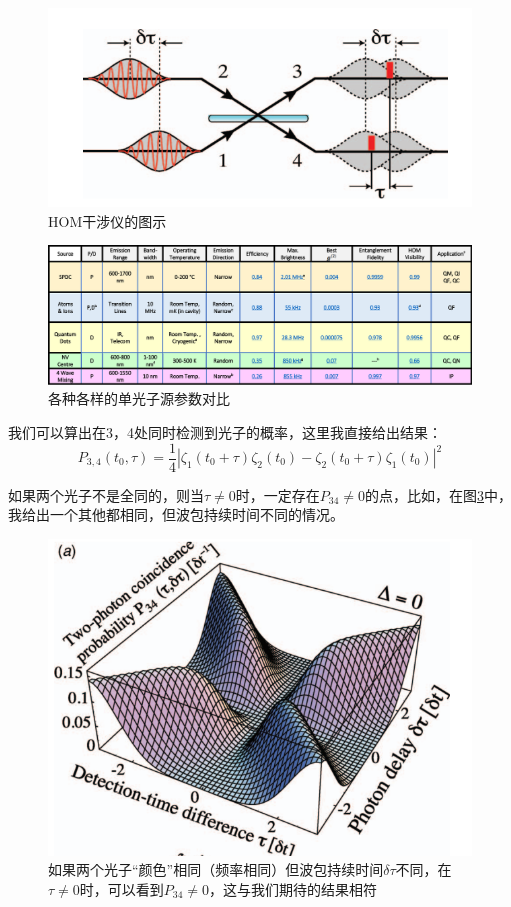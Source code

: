 \begin{figure}[ht]
	\centering
	\includegraphics[scale=0.25]{pic/hom}
	\caption{HOM干涉仪的图示}
	\label{fig:hom}
\end{figure}


\begin{figure}[ht]
	\centering
	\includegraphics[scale=0.25]{pic/singlephotonsources}
	\caption{各种各样的单光子源参数对比}
	\label{fig:singlephotonsources}
\end{figure}


我们可以算出在3，4处同时检测到光子的概率，这里我直接给出结果：
\[P_{3,4}(t_0,\tau)=\frac{1}{4}|\zeta_1(t_0+\tau)\zeta_2(t_0)-\zeta_2(t_0+\tau)\zeta_1(t_0)|^2\]

如果两个光子不是全同的，则当$\tau\neq0$时，一定存在$P_{34}\neq0$的点，比如，在图\ref{fig:hom1}中，我给出一个其他都相同，但波包持续时间不同的情况。

\begin{figure}[ht]
	\centering
	\includegraphics[scale=0.25]{pic/hom1}
	\caption{如果两个光子“颜色”相同（频率相同）但波包持续时间$\delta\tau$不同，在$\tau\neq0$时，可以看到$P_{34}\neq0$，这与我们期待的结果相符}
	\label{fig:hom1}
\end{figure}

